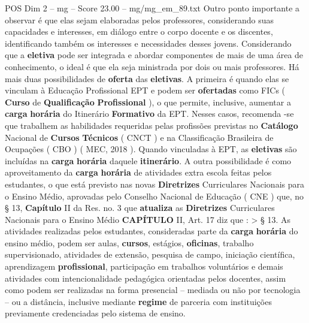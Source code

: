 \begin{textsample}{POS Dim 2 – mg – Score 23.00 – mg/mg\_em\_89.txt}
Outro ponto importante a observar é que elas sejam elaboradas pelos professores, considerando suas capacidades e interesses, em diálogo entre o corpo docente e os discentes, identificando também os interesses e necessidades desses jovens.
Considerando que a \textbf{eletiva} pode ser integrada e abordar componentes de mais de uma área de conhecimento, o ideal é que ela seja ministrada por dois ou mais professores.
Há mais duas possibilidades de \textbf{oferta} das \textbf{eletivas}.
A primeira é quando elas se vinculam à Educação Profissional EPT e podem ser \textbf{ofertadas} como FICs ( \textbf{Curso} de \textbf{Qualificação} \textbf{Profissional} ), o que permite, inclusive, aumentar a \textbf{carga} \textbf{horária} do Itinerário \textbf{Formativo} da EPT.
Nesses casos, recomenda -se que trabalhem as habilidades requeridas pelas profissões previstas no \textbf{Catálogo} Nacional de \textbf{Cursos} \textbf{Técnicos} ( CNCT ) e na Classificação Brasileira de Ocupações ( CBO ) ( MEC, 2018 ).
Quando vinculadas à EPT, as \textbf{eletivas} são incluídas na \textbf{carga} \textbf{horária} daquele \textbf{itinerário}.
A outra possibilidade é como aproveitamento da \textbf{carga} \textbf{horária} de atividades extra escola feitas pelos estudantes, o que está previsto nas novas \textbf{Diretrizes} Curriculares Nacionais para o Ensino Médio, aprovadas pelo Conselho Nacional de Educação ( CNE ) que, no § 13, \textbf{Capítulo} II da Res. no. 3 que \textbf{atualiza} as \textbf{Diretrizes} Curriculares Nacionais para o Ensino Médio \textbf{CAPÍTULO} II, Art. 17 diz que : > § 13.
As atividades realizadas pelos estudantes, consideradas parte da \textbf{carga} \textbf{horária} do ensino médio, podem ser aulas, \textbf{cursos}, estágios, \textbf{oficinas}, trabalho supervisionado, atividades de extensão, pesquisa de campo, iniciação científica, aprendizagem \textbf{profissional}, participação em trabalhos voluntários e demais atividades com intencionalidade pedagógica orientadas pelos docentes, assim como podem ser realizadas na forma presencial – mediada ou não por tecnologia – ou a distância, inclusive mediante \textbf{regime} de parceria com instituições previamente credenciadas pelo sistema de ensino.

\end{textsample}
